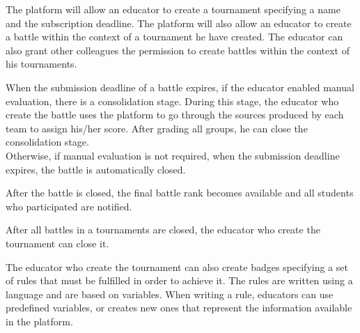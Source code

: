 The platform will allow an educator to create a tournament specifying a name and the subscription deadline.
The platform will also allow an educator to create a battle within the context of a tournament he have created.
The educator can also grant other colleagues the permission to create battles within the context of his tournaments.

When the submission deadline of a battle expires, if the educator enabled manual evaluation, there is a consolidation stage.
During this stage, the educator who create the battle uses the platform to go through the sources produced by each team to assign his/her score. 
After grading all groups, he can close the consolidation stage.\\
Otherwise, if manual evaluation is not required, when the submission deadline expires, the battle is automatically closed.

After the battle is closed, the final battle rank becomes available and all students who participated are notified.

After all battles in a tournaments are closed, the educator who create the tournament can close it.

The educator who create the tournament can also create badges specifying a set of rules that must be fulfilled in order to achieve it.
The rules are written using a language  and are based on variables.
When writing a rule, educators can use predefined variables, or creates new ones that represent the information available in the platform.

